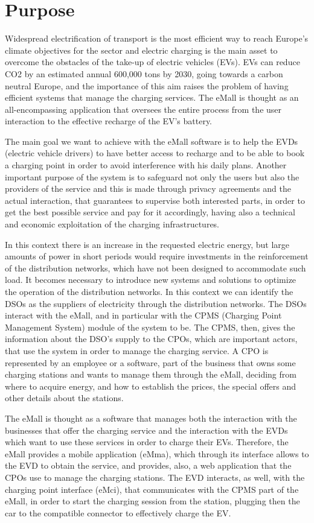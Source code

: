 \section{Purpose}
\label{sec:purpose}%
Widespread electrification of transport is the most efficient way to reach Europe’s climate objectives for the sector and electric charging is the main asset to overcome the obstacles of the take-up of electric vehicles (EVs). EVs can reduce CO2 by an estimated annual 600,000 tons by 2030, going towards a carbon neutral Europe, and the importance of this aim raises the problem of having efficient systems that manage the charging services. The eMall is thought as an all-encompassing application that oversees the entire process from the user interaction to the effective recharge of the EV's battery.

The main goal we want to achieve with the eMall software is to help the EVDs (electric vehicle drivers) to have better access to recharge and to be able to book a charging point in order to avoid interference with his daily plans. Another important purpose of the system is to safeguard not only the users but also the providers of the service and this is made through privacy agreements and the actual interaction, that guarantees to supervise both interested parts, in order to get the best possible service and pay for it accordingly, having also a technical and economic exploitation of the charging infrastructures.

In this context there is an increase in the requested electric energy, but large amounts of power in short periods would require investments in the reinforcement of the distribution networks, which have not been designed to accommodate such load. It becomes necessary to introduce new systems and solutions to optimize the operation of the distribution networks. In this context we can identify the DSOs as the suppliers of electricity through the distribution networks. The DSOs interact with the eMall, and in particular with the CPMS (Charging Point Management System) module of the system to be. The CPMS, then, gives the information about the DSO's supply to the CPOs, which are important actors, that use the system in order to manage the charging service. A CPO is represented by an employee or a software, part of the business that owns some charging stations and wants to manage them through the eMall, deciding from where to acquire energy, and how to establish the prices, the special offers and other details about the stations.

The eMall is thought as a software that manages both the interaction with the businesses that offer the charging service and the interaction with the EVDs which want to use these services in order to charge their EVs. Therefore, the eMall provides a mobile application (eMma), which through its interface allows to the EVD to obtain the service, and provides, also, a web application that the CPOs use to manage the charging stations. The EVD interacts, as well, with the charging point interface (eMci), that communicates with the CPMS part of the eMall, in order to start the charging session from the station, plugging then the car to the compatible connector to effectively charge the EV.\\

